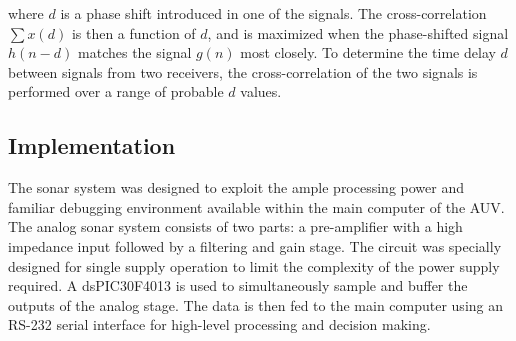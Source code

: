 where $d$ is a phase shift introduced in one of the signals. The
cross-correlation $\sum x(d)$ is then a function of $d$, and is
maximized when the phase-shifted signal $h(n-d)$ matches the signal
$g(n)$ most closely.  To determine the time delay $d$ between signals
from two receivers, the cross-correlation of the two signals is
performed over a range of probable $d$ values.


\subsection{Implementation}
The sonar system was designed to exploit the ample processing power
and familiar debugging environment available  within the main
computer of the AUV. The analog sonar
system consists of two parts: a pre-amplifier with a high
impedance input  followed by
a  filtering and gain stage. The circuit was
specially designed for single supply operation to limit the complexity
of the power supply required.  A dsPIC30F4013 is used to
simultaneously sample and buffer the outputs of the analog stage. The
data is then fed to the main computer using an RS-232 serial interface
for high-level processing and decision making.
